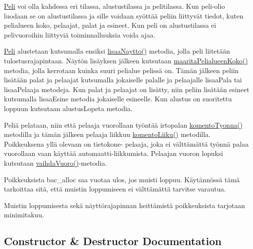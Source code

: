 \hyperlink{class_peli}{Peli} voi olla kahdessa eri tilassa, alustustilassa ja pelitilassa. Kun peli-\/olio luodaan se on alustustilassa ja sille voidaan syöttää peliin liittyvät tiedot, kuten pelialueen koko, pelaajat, palat ja esineet. Kun peli on alustustilassa ei pelivuoroihin liittyviä toiminnalluuksia voida ajaa.

\hyperlink{class_peli}{Peli} alustetaan kutsumalla ensiksi \hyperlink{class_julkinen_1_1_pelirajapinta_ad1597bf68505144431c62cc7c6e49bf6}{lisaa\+Naytto()} metodia, jolla peli liitetään tulostusrajapintaan. Näytön lisäyksen jälkeen kutsutaan \hyperlink{class_julkinen_1_1_pelirajapinta_aeaa98dab134d9345ef33fbf92224702e}{maarita\+Pelialueen\+Koko()} metodia, jolla kerrotaan kuinka suuri pelialue pelissä on. Tämän jälkeen peliin lisätään palat ja pelaajat kutsumalla jokaiselle palalle ja pelaajalle lisaa\+Pala tai lisaa\+Pelaaja metodeja. Kun palat ja pelaajat on lisätty, niin peliin lisätään esineet kutsumalla lisaa\+Esine metodia jokaiselle esineelle. Kun alustus on suoritettu loppuun kutsutaan alustus\+Lopeta metodia.

Peliä pelataan, niin että pelaaja vuorollaan työntää irtopalan \hyperlink{class_julkinen_1_1_pelirajapinta_aea8cbb43bcf85664b97d17df1666ce9f}{komento\+Tyonna()} metodilla ja tämän jälkeen pelaaja liikkuu \hyperlink{class_julkinen_1_1_pelirajapinta_a3444c155143baff73521a0707712b36a}{komento\+Liiku()} metodilla. Poikkeuksena yllä olevaan on tietokone-\/ pelaaja, joka ei välttämättä työnnä palaa vuorollaan vaan käyttää automaatti-\/liikkumista. Pelaajan vuoron lopuksi kutsutaan \hyperlink{class_julkinen_1_1_pelirajapinta_a873b4d57d698b82df131246df85c3193}{vaihda\+Vuoro()}-\/metodia. \begin{DoxyVerb}    Poikkeuksista bac_alloc saa vuotaa ulos, jos muisti loppuu. Käytännössä
    tämä tarkoittaa sitä, että muistin loppumiseen ei välttämättä tarvitse 
    varautua.

    Muistin loppumisesta sekä näyttörajapinnan heittämistä poikkeuksista tarjotaan minimitakuu.\end{DoxyVerb}
 

\subsection{Constructor \& Destructor Documentation}
\hypertarget{class_julkinen_1_1_pelirajapinta_a9d639630818d96bdea435e2f36eb667a}{}
